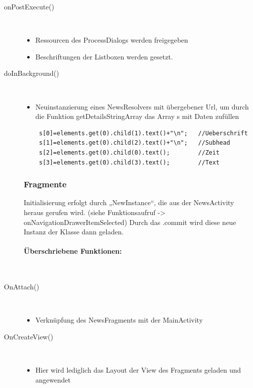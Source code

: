 \begin{description}
\item[onPostExecute()]~\par
\begin{itemize}
\item Ressourcen des ProcessDialogs werden freigegeben
\item Beschriftungen der Listboxen werden gesetzt.
\end{itemize}

\item[doInBackground()]~\par
\begin{itemize}
\item Neuinstanzierung eines NewsResolvers mit übergebener Url, um durch die Funktion getDetailsStringArray das Array s mit Daten zufüllen
\begin{lstlisting}
 s[0]=elements.get(0).child(1).text()+"\n";   //Ueberschrift
 s[1]=elements.get(0).child(2).text()+"\n";   //Subhead
 s[2]=elements.get(0).child(0).text();        //Zeit
 s[3]=elements.get(0).child(3).text();        //Text
\end{lstlisting}
\end{itemize}
\newpage
\subsubsection{Fragmente}
Initialisierung erfolgt durch „NewInstance“, die aus der NewsActivity heraus gerufen wird. (siehe Funktionsaufruf -> onNavigationDrawerItemSelected)
Durch das .commit wird diese neue Instanz der Klasse dann geladen.
\paragraph{Überschriebene Funktionen:}
\ \\[1em]
\item[OnAttach()]~\par
\begin{itemize}
\item Verknüpfung des NewsFragments mit der MainActivity
\end{itemize}

\item[OnCreateView()]~\par
\begin{itemize}
\item Hier wird lediglich das Layout der View des Fragments geladen und angewendet
\end{itemize}


\end{description}

